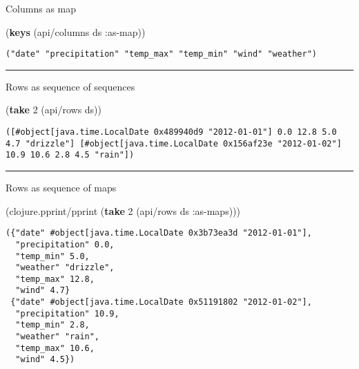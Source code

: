 \documentclass[]{article}
\newenvironment{Shaded}{\begin{snugshade}}{\end{snugshade}}
\newcommand{\KeywordTok}[1]{\textcolor[rgb]{0.13,0.29,0.53}{\textbf{#1}}}
\newcommand{\DecValTok}[1]{\textcolor[rgb]{0.00,0.00,0.81}{#1}}
\newcommand{\AttributeTok}[1]{\textcolor[rgb]{0.77,0.63,0.00}{#1}}
\newcommand{\NormalTok}[1]{#1}
\begin{document}
Columns as map

\begin{Shaded}
\begin{Highlighting}[]
\NormalTok{(}\KeywordTok{keys}\NormalTok{ (api/columns ds }\AttributeTok{:as-map}\NormalTok{))}
\end{Highlighting}
\end{Shaded}

\begin{verbatim}
("date" "precipitation" "temp_max" "temp_min" "wind" "weather")
\end{verbatim}

\begin{center}\rule{0.5\linewidth}{0.5pt}\end{center}

Rows as sequence of sequences

\begin{Shaded}
\begin{Highlighting}[]
\NormalTok{(}\KeywordTok{take} \DecValTok{2}\NormalTok{ (api/rows ds))}
\end{Highlighting}
\end{Shaded}

\begin{verbatim}
([#object[java.time.LocalDate 0x489940d9 "2012-01-01"] 0.0 12.8 5.0 4.7 "drizzle"] [#object[java.time.LocalDate 0x156af23e "2012-01-02"] 10.9 10.6 2.8 4.5 "rain"])
\end{verbatim}

\begin{center}\rule{0.5\linewidth}{0.5pt}\end{center}

Rows as sequence of maps

\begin{Shaded}
\begin{Highlighting}[]
\NormalTok{(clojure.pprint/pprint (}\KeywordTok{take} \DecValTok{2}\NormalTok{ (api/rows ds }\AttributeTok{:as-maps}\NormalTok{)))}
\end{Highlighting}
\end{Shaded}

\begin{verbatim}
({"date" #object[java.time.LocalDate 0x3b73ea3d "2012-01-01"],
  "precipitation" 0.0,
  "temp_min" 5.0,
  "weather" "drizzle",
  "temp_max" 12.8,
  "wind" 4.7}
 {"date" #object[java.time.LocalDate 0x51191802 "2012-01-02"],
  "precipitation" 10.9,
  "temp_min" 2.8,
  "weather" "rain",
  "temp_max" 10.6,
  "wind" 4.5})
\end{verbatim}
\end{document}
